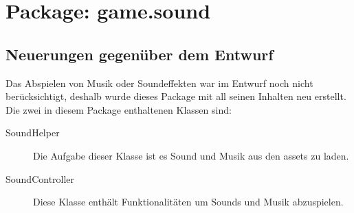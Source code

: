 \section{Package: game.sound}

\subsection{Neuerungen gegenüber dem Entwurf}

Das Abspielen von Musik oder Soundeffekten war im Entwurf noch nicht berücksichtigt, deshalb wurde dieses Package mit all seinen Inhalten neu erstellt. Die zwei in diesem Package enthaltenen Klassen sind:

\begin{description}
\item[SoundHelper]
Die Aufgabe dieser Klasse ist es Sound und Musik aus den assets zu laden.
\item[SoundController]
Diese Klasse enthält Funktionalitäten um Sounds und Musik abzuspielen.
\end{description}



